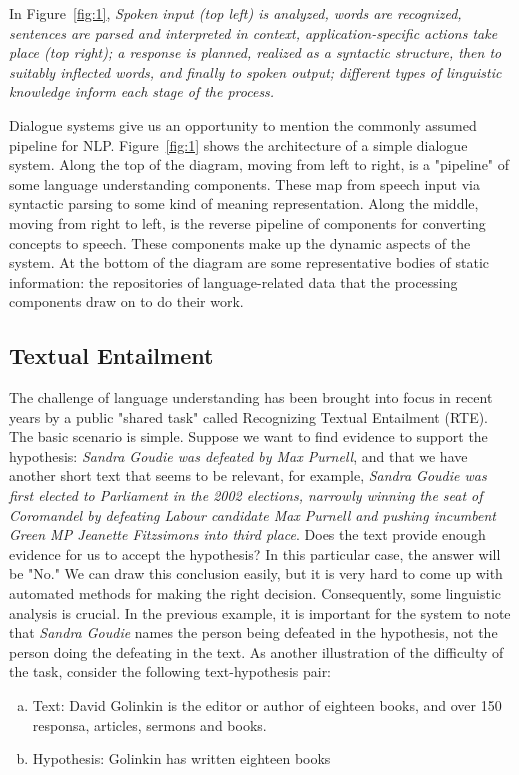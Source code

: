 In Figure~\ref{fig:1}, \emph{Spoken input (top left) is analyzed, words are recognized, sentences are parsed and interpreted in context, application-specific actions take place (top right); a response is planned, realized as a syntactic structure, then to suitably inflected words, and finally to spoken output; different types of linguistic knowledge inform each stage of the process.}

Dialogue systems give us an opportunity to mention the commonly assumed pipeline for NLP. Figure~\ref{fig:1} shows the architecture of a simple dialogue system. Along the top of the diagram, moving from left to right, is a "pipeline" of some language understanding components. These map from speech input via syntactic parsing to some kind of meaning representation. Along the middle, moving from right to left, is the reverse pipeline of components for converting concepts to speech. These components make up the dynamic aspects of the system. At the bottom of the diagram are some representative bodies of static information: the repositories of language-related data that the processing components draw on to do their work.

\subsection{Textual Entailment}
The challenge of language understanding has been brought into focus in recent years by a public "shared task" called Recognizing Textual Entailment (RTE). The basic scenario is simple. Suppose we want to find evidence to support the hypothesis: \emph{Sandra Goudie was defeated by Max Purnell}, and that we have another short text that seems to be relevant, for example, \emph{Sandra Goudie was first elected to Parliament in the 2002 elections, narrowly winning the seat of Coromandel by defeating Labour candidate Max Purnell and pushing incumbent Green MP Jeanette Fitzsimons into third place}. Does the text provide enough evidence for us to accept the hypothesis? In this particular case, the answer will be "No." We can draw this conclusion easily, but it is very hard to come up with automated methods for making the right decision.
Consequently, some linguistic analysis is crucial. In the previous example, it is important for the system to note that \emph{Sandra Goudie} names the person being defeated in the hypothesis, not the person doing the defeating in the text. As another illustration of the difficulty of the task, consider the following text-hypothesis pair:
\begin{enumerate}[a.]
    \item Text: David Golinkin is the editor or author of eighteen books, and over 150 responsa, articles, sermons and books.
    \item Hypothesis: Golinkin has written eighteen books
    
\end{enumerate}

